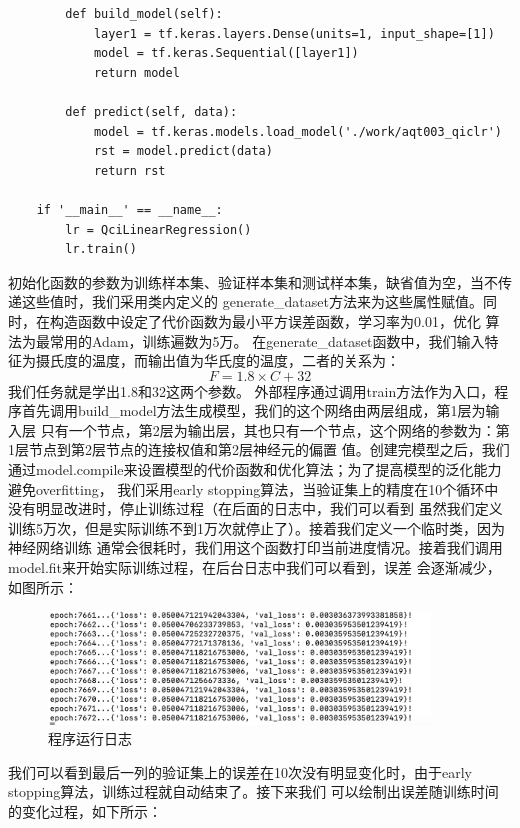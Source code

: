 \documentclass{article}
\begin{document}
\begin{lstlisting}
        def build_model(self):
            layer1 = tf.keras.layers.Dense(units=1, input_shape=[1])
            model = tf.keras.Sequential([layer1])
            return model
    
        def predict(self, data):
            model = tf.keras.models.load_model('./work/aqt003_qiclr')
            rst = model.predict(data)
            return rst
    
    if '__main__' == __name__:
        lr = QciLinearRegression()
        lr.train()    
\end{lstlisting}
初始化函数的参数为训练样本集、验证样本集和测试样本集，缺省值为空，当不传递这些值时，我们采用类内定义的
generate\_dataset方法来为这些属性赋值。同时，在构造函数中设定了代价函数为最小平方误差函数，学习率为0.01，优化
算法为最常用的Adam，训练遍数为5万。\newline
在generate\_dataset函数中，我们输入特征为摄氏度的温度，而输出值为华氏度的温度，二者的关系为：
\begin{equation}
F = 1.8 \times C + 32
\label{e000062}
\end{equation}
我们任务就是学出1.8和32这两个参数。\newline
外部程序通过调用train方法作为入口，程序首先调用build\_model方法生成模型，我们的这个网络由两层组成，第1层为输入层
只有一个节点，第2层为输出层，其也只有一个节点，这个网络的参数为：第1层节点到第2层节点的连接权值和第2层神经元的偏置
值。创建完模型之后，我们通过model.compile来设置模型的代价函数和优化算法；为了提高模型的泛化能力避免overfitting，
我们采用early stopping算法，当验证集上的精度在10个循环中没有明显改进时，停止训练过程（在后面的日志中，我们可以看到
虽然我们定义训练5万次，但是实际训练不到1万次就停止了）。接着我们定义一个临时类，因为神经网络训练
通常会很耗时，我们用这个函数打印当前进度情况。接着我们调用model.fit来开始实际训练过程，在后台日志中我们可以看到，误差
会逐渐减少，如图所示：
\begin{figure}[H]
	\caption{程序运行日志}
	\label{f000045}
	\centering
	\includegraphics[height=3cm]{images/f000045}
\end{figure}
我们可以看到最后一列的验证集上的误差在10次没有明显变化时，由于early stopping算法，训练过程就自动结束了。接下来我们
可以绘制出误差随训练时间的变化过程，如下所示：
\end{document}
